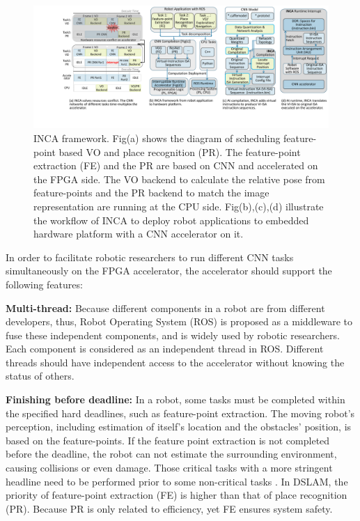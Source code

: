 \begin{figure}[t]
    \centering
 \includegraphics[width=0.99\linewidth]{fig/inca.pdf}
 \caption{ INCA framework. Fig(a) shows the diagram of scheduling feature-point based VO and place recognition (PR). The feature-point extraction (FE) and the PR are based on CNN and accelerated on the FPGA side. The VO backend to calculate the relative pose from feature-points and the PR backend to match the image representation are running at the CPU side. Fig(b),(c),(d) illustrate the workflow of INCA to deploy robot applications to embedded hardware platform with a CNN accelerator on it.
 }
	\label{fig:inca}
\end{figure}

In order to facilitate robotic researchers to run different CNN tasks simultaneously on the FPGA accelerator, the accelerator should support the following features:

\textbf{Multi-thread:} Because different components in a robot are from different developers, thus, Robot Operating System (ROS) \cite{quigley2009ros} is proposed as a middleware to fuse these independent components, and is widely used by robotic researchers. Each component is considered as an independent thread in ROS. Different threads should have independent access to the accelerator without knowing the status of others.

\textbf{Finishing before deadline:} In a robot, some tasks must be completed within the specified hard deadlines, such as feature-point extraction. The moving robot's perception, including estimation of itself's location and the obstacles' position, is based on the feature-points. If the feature point extraction is not completed before the deadline, the robot can not estimate the surrounding environment, causing collisions or even damage. Those critical tasks with a more stringent headline need to be performed prior to some non-critical tasks \cite{RamsauerKLM17}. In DSLAM, the priority of feature-point extraction (FE) is higher than that of place recognition (PR). Because PR is only related to efficiency, yet FE ensures system safety.

